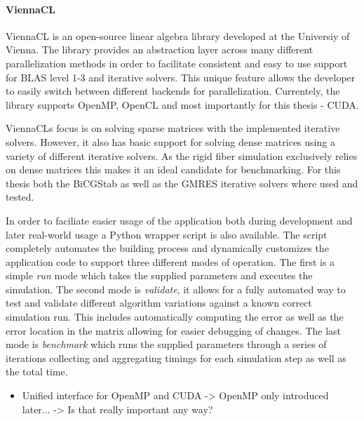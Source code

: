 \documentclass[a4paper,11pt]{kth-mag}
\begin{document}
\paragraph{ViennaCL}
ViennaCL is an open-source linear algebra library developed at the Universiy of Vienna. The library provides an abstraction layer across many different parallelization methods in order to facilitate consistent and easy to use support for BLAS level 1-3 and iterative solvers. This unique feature allows the developer to easily switch between different backends for parallelization. Currentely, the library supports OpenMP, OpenCL and most importantly for this thesis - CUDA.

ViennaCLs focus is on solving sparse matrices with the implemented iterative solvers. However, it also has basic support for solving dense matrices using a variety of different iterative solvers. As the rigid fiber simulation exclusively relies on dense matrices this makes it an ideal candidate for benchmarking. For this thesis both the BiCGStab as well as the GMRES iterative solvers where used and tested.

In order to faciliate easier usage of the application both during development and later real-world usage a Python wrapper script is also available. The script completely automates the building process and dynamically customizes the application code to support three different modes of operation. The first is a simple \emph{run} mode which takes the supplied parameters and executes the simulation. The second mode is \emph{validate}, it allows for a fully automated way to test and validate different algorithm variations against a known correct simulation run. This includes automatically computing the error as well as the error location in the matrix allowing for easier debugging of changes. The last mode is \emph{benchmark} which runs the supplied parameters through a series of iterations collecting and aggregating timings for each simulation step as well as the total time.

\begin{itemize}
\item Unified interface for OpenMP and CUDA -> OpenMP only introduced later... -> Is that really important any way?
\end{itemize}
\end{document}

